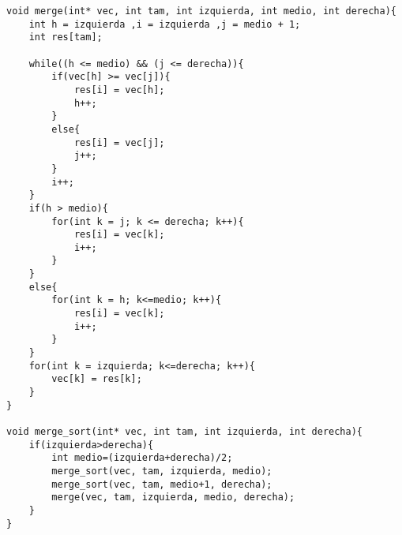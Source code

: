 \begin{lstlisting}
void merge(int* vec, int tam, int izquierda, int medio, int derecha){
    int h = izquierda ,i = izquierda ,j = medio + 1;
    int res[tam];
    
    while((h <= medio) && (j <= derecha)){
        if(vec[h] >= vec[j]){
            res[i] = vec[h];
            h++;
        }
        else{
            res[i] = vec[j];
            j++;
        }
        i++;
    }
    if(h > medio){
        for(int k = j; k <= derecha; k++){
            res[i] = vec[k];
            i++;
        }
    }
    else{
        for(int k = h; k<=medio; k++){
            res[i] = vec[k];
            i++;
        }
    }
    for(int k = izquierda; k<=derecha; k++){
        vec[k] = res[k];
    }
}

void merge_sort(int* vec, int tam, int izquierda, int derecha){
    if(izquierda>derecha){
        int medio=(izquierda+derecha)/2;
        merge_sort(vec, tam, izquierda, medio);
        merge_sort(vec, tam, medio+1, derecha);
        merge(vec, tam, izquierda, medio, derecha);
    }
}
\end{lstlisting}